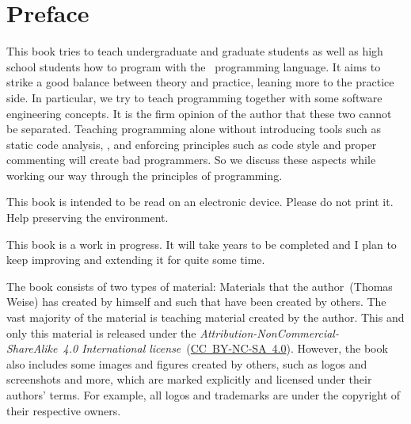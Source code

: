 \chapter*{Preface}%
%
%
This book tries to teach undergraduate and graduate students as well as high school students how to program with the \python\ programming language.
It aims to strike a good balance between theory and practice, leaning more to the practice side.
In particular, we try to teach programming together with some software engineering concepts.
It is the firm opinion of the author that these two cannot be separated.
Teaching programming alone without introducing tools such as static code analysis, , and enforcing principles such as code style and proper commenting will create bad programmers.
So we discuss these aspects while working our way through the principles of programming.

This book is intended to be read on an electronic device.
Please do not print it.
Help preserving the environment.

This book is a work in progress.
It will take years to be completed and I plan to keep improving and extending it for quite some time.

The book consists of two types of material:
Materials that the author~(Thomas Weise) has created by himself and such that have been created by others.
The vast majority of the material is teaching material created by the author.
This and only this material is released under the \emph{Attribution-NonCommercial-ShareAlike~4.0 International license}~(\href{http://creativecommons.org/licenses/by-nc-sa/4.0}{\mbox{CC~BY-NC-SA~4.0}}).
However, the book also includes some images and figures created by others, such as logos and screenshots and more, which are marked explicitly and licensed under their authors' terms.
For example, all logos and trademarks are under the copyright of their respective owners.

